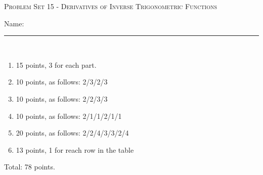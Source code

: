 \documentclass{article}
\begin{document}
\begin{center}
  \large\textsc{Problem Set 15 - Derivatives of Inverse Trigonometric Functions}
  
      \pspace{12pt}
  \begin{problemonly}\large Name: \rule{5cm}{0.15mm}\\ \end{problemonly}
\end{center}

\begin{grading}
\begin{enumerate}
    \item 15 points, 3 for each part.
    \item 10 points, as follows: 2/3/2/3
    \item 10 points, as follows: 2/2/3/3
    \item 10 points, as follows: 2/1/1/2/1/1
    \item 20 points, as follows: 2/2/4/3/3/2/4
    \item 13 points, 1 for reach row in the table
\end{enumerate}
Total: 78 points.
\end{grading}
\end{document}
